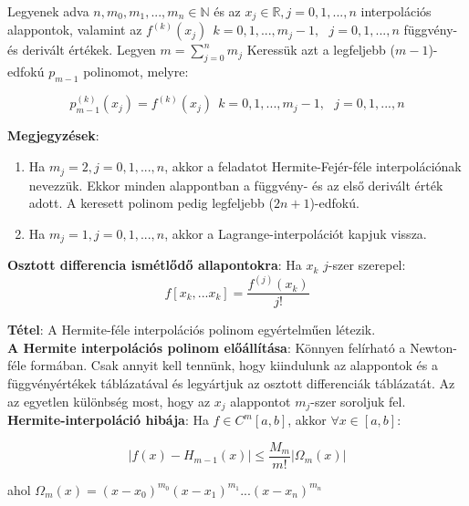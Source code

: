 \documentclass[margin=0px]{article}
\begin{document}
	\noindent Legyenek adva $n,m_{0},m_{1},..., m_{n} \in \mathbb{N}$ és az $x_{j} \in \mathbb{R}, j=0,1,...,n$ interpolációs
	alappontok, valamint az $f^{(k)}(x_{j}) \ \ k=0,1,...,m_{j}-1, \ \ \ j=0,1,...,n$ függvény- és derivált értékek. Legyen
	$m = \displaystyle\sum_{j=0}^{n}m_{j}$ Keressük azt a legfeljebb ($m-1$)-edfokú $p_{m-1}$ polinomot, melyre:
	
	\begin{displaymath}
		p^{(k)}_{m-1}(x_{j}) = f^{(k)}(x_{j}) \ \ k=0,1,...,m_{j}-1, \ \ \ j=0,1,...,n
	\end{displaymath}
	
	\noindent \textbf{Megjegyzések}:
	\begin{enumerate}
		\item	Ha $m_{j}=2, j=0,1,...,n$, akkor a feladatot Hermite-Fejér-féle interpolációnak nevezzük. Ekkor minden alappontban
		a függvény- és az első derivált érték adott. A keresett polinom pedig legfeljebb ($2n+1$)-edfokú.
		
		\item	Ha $m_{j}=1, j=0,1,...,n$, akkor a Lagrange-interpolációt kapjuk vissza.
	\end{enumerate}
	
	\noindent \textbf{Osztott differencia ismétlődő allapontokra}: Ha $x_{k}$ $j$-szer szerepel:
	\begin{displaymath}
		f[x_{k}, ... x_{k}] = \frac{f^{(j)}(x_{k})}{j!}
	\end{displaymath}
	
	\noindent \textbf{Tétel}: A Hermite-féle interpolációs polinom egyértelműen létezik.\\
	
	\noindent \textbf{A Hermite interpolációs polinom előállítása}: Könnyen felírható a Newton-féle formában. Csak annyit
	kell tennünk, hogy kiindulunk az alappontok és a függvényértékek táblázatával és legyártjuk az osztott differenciák
	táblázatát. Az az egyetlen különbség most, hogy az $x_{j}$ alappontot $m_{j}$-szer soroljuk fel.\\
	
	\noindent \textbf{Hermite-interpoláció hibája}: Ha $f \in C^{m}[a,b]$, akkor $\forall x \in [a,b]:$
	
	\begin{displaymath}
		|f(x) - H_{m-1}(x)| \leq \frac{M_{m}}{m!}|\Omega_{m}(x)|
	\end{displaymath}
	
	\noindent ahol $\Omega_{m}(x) = (x-x_{0})^{m_{0}}(x-x_{1})^{m_{1}}...(x-x_{n})^{m_{n}}$
	
\end{document}

